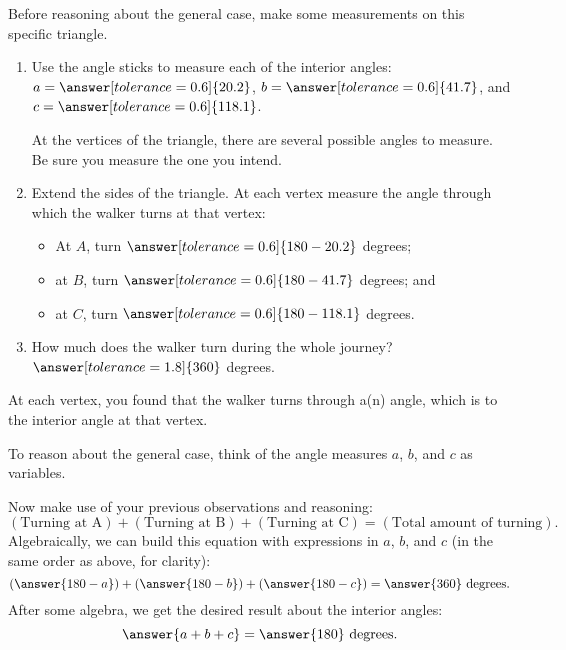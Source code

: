 \documentclass[nooutcomes,noauthor]{ximera}
\begin{document}
\begin{problem}
\begin{problem}
Before reasoning about the general case, make some measurements on this specific triangle.  
\begin{enumerate}
\item Use the angle sticks to measure each of the interior angles: $a=\answer[tolerance=0.6]{20.2}$, $b=\answer[tolerance=0.6]{41.7}$, and $c=\answer[tolerance=0.6]{118.1}$.
\begin{hint}
At the vertices of the triangle, there are several possible angles to measure.  Be sure you measure the one you intend. 
\end{hint}
\item Extend the sides of the triangle.  At each vertex measure the angle through which the walker turns at that vertex:  
\begin{itemize}
\item At $A$, turn $\answer[tolerance=0.6]{180-20.2}$ degrees;  
\item at $B$, turn $\answer[tolerance=0.6]{180-41.7}$ degrees; and 
\item at $C$, turn $\answer[tolerance=0.6]{180-118.1}$ degrees.
\end{itemize}
\item How much does the walker turn during the whole journey?  $\answer[tolerance=1.8]{360}$ degrees.
\end{enumerate}

\begin{problem}
At each vertex, you found that the walker turns through a(n) 
 angle, which is 
 to the interior angle at that vertex.  

To reason about the general case, think of the angle measures $a$, $b$, and $c$ as variables.  


Now make use of your previous observations and reasoning:  
\[
\left(\text{Turning at A}\right) + \left(\text{Turning at B}\right) + \left(\text{Turning at C}\right) = \left(\text{Total amount of turning}\right).
\]
Algebraically, we can build this equation with expressions in $a$, $b$, and $c$ (in the same order as above, for clarity):  
\[
\left(\answer{180-a}\right) + \left(\answer{180-b}\right) + \left(\answer{180-c}\right)  = \answer{360} \text{ degrees.}
\]
After some algebra, we get the desired result about the interior angles:  
\[
\answer{a+b+c}=\answer{180} \text{ degrees}. 
\]

\end{problem}
\end{problem}
\end{problem}
\end{document}
